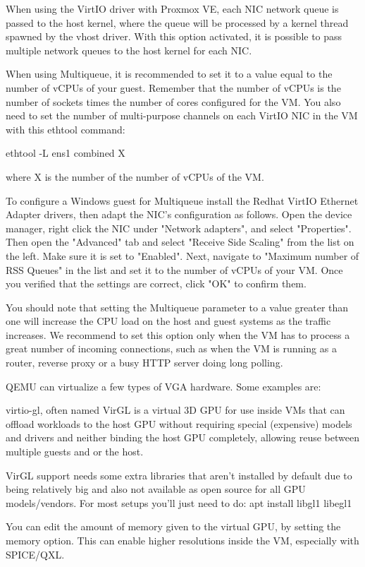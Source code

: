 When using the VirtIO driver with Proxmox VE, each NIC network queue is passed to the host kernel, where the queue will be processed by a kernel thread spawned by the vhost driver. With this option activated, it is possible to pass multiple network queues to the host kernel for each NIC.

When using Multiqueue, it is recommended to set it to a value equal to the number of vCPUs of your guest. Remember that the number of vCPUs is the number of sockets times the number of cores configured for the VM. You also need to set the number of multi-purpose channels on each VirtIO NIC in the VM with this ethtool command:

ethtool -L ens1 combined X

where X is the number of the number of vCPUs of the VM.

To configure a Windows guest for Multiqueue install the Redhat VirtIO Ethernet Adapter drivers, then adapt the NIC’s configuration as follows. Open the device manager, right click the NIC under "Network adapters", and select "Properties". Then open the "Advanced" tab and select "Receive Side Scaling" from the list on the left. Make sure it is set to "Enabled". Next, navigate to "Maximum number of RSS Queues" in the list and set it to the number of vCPUs of your VM. Once you verified that the settings are correct, click "OK" to confirm them.

You should note that setting the Multiqueue parameter to a value greater than one will increase the CPU load on the host and guest systems as the traffic increases. We recommend to set this option only when the VM has to process a great number of incoming connections, such as when the VM is running as a router, reverse proxy or a busy HTTP server doing long polling.

QEMU can virtualize a few types of VGA hardware. Some examples are:

virtio-gl, often named VirGL is a virtual 3D GPU for use inside VMs that can offload workloads to the host GPU without requiring special (expensive) models and drivers and neither binding the host GPU completely, allowing reuse between multiple guests and or the host.

VirGL support needs some extra libraries that aren’t installed by default due to being relatively big and also not available as open source for all GPU models/vendors. For most setups you’ll just need to do: apt install libgl1 libegl1

You can edit the amount of memory given to the virtual GPU, by setting the memory option. This can enable higher resolutions inside the VM, especially with SPICE/QXL.

